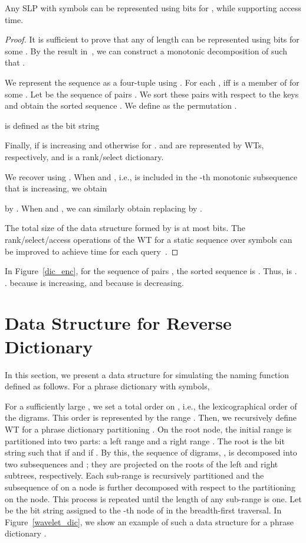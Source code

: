 \documentclass[10pt]{llncs}
\begin{document}
\begin{theorem}\label{th2}
Any SLP with  symbols can be represented using  bits
for , while supporting  access time. 
\end{theorem}
\begin{proof}
It is sufficient to prove that any  of length  
can be represented using  bits for some .
By the result in~\cite{Yehuda1998},
we can construct a monotonic decomposition  of  such that
.

We represent the sequence  as a four-tuple  using .
For each ,  iff 
 is a member of  for some .
Let  be the sequence of pairs  .
We sort these pairs with respect to the keys   and 
obtain the sorted sequence . 
We define  as the permutation . 

 is defined as the bit string


Finally,  if  is increasing and
 otherwise for .
 and  are represented by WTs, respectively, and  is a rank/select dictionary.

We recover  using .
When  and , i.e.,  is included in the 
-th monotonic subsequence  that is increasing, 
we obtain 
 
by .
When  and , we can similarly obtain  
replacing  by .

The total size of the data structure formed by 
is at most  bits. 
The rank/select/access operations of the WT for a static sequence over  symbols 
can be improved to achieve  time for each query~\cite{Jeremy2010,Golynski2006}.
\hspace{\fill}
\end{proof}

In Figure~\ref{dic_enc}, for the sequence  of pairs  , 
the sorted sequence is .
Thus,  is . 
.
 because  is increasing, and  because  is decreasing.

\section{Data Structure for Reverse Dictionary}

In this section, we present a data structure for simulating 
the naming function  defined as follows.
For a phrase dictionary  with  symbols,


For a sufficiently large , 
we set a total order on , i.e., 
the lexicographical order of the  digrams.
This order is represented by the range .
Then, we recursively define WT  for a phrase dictionary  
partitioning .
On the root node, the initial range  is partitioned into two parts: a left range
 and a right range .
The root is the bit string  such that
 if  and  if .
By this, the sequence of digrams, , is decomposed into two subsequences  and ;
they are projected on the roots of the left and right subtrees, respectively.
Each sub-range is recursively partitioned and 
the subsequence of  on a node is further decomposed
with respect to the partitioning on the node.
This process is repeated until the length of any sub-range is one.
Let  be the bit string assigned to the -th node
of  in the breadth-first traversal.
In Figure~\ref{wavelet_dic}, we show an example
of such a data structure for a phrase dictionary .
\end{document}
